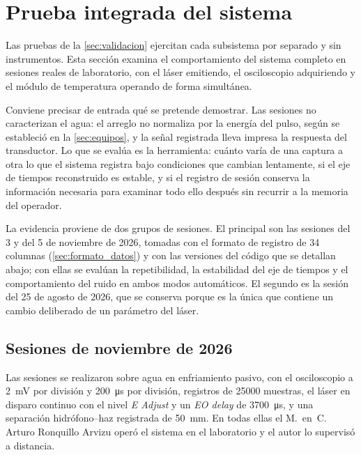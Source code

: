 \section{Prueba integrada del sistema}
\label{sec:prueba_integrada}

Las pruebas de la \cref{sec:validacion} ejercitan cada subsistema por
separado y sin instrumentos. Esta sección examina el comportamiento del
sistema completo en sesiones reales de laboratorio, con el láser
emitiendo, el osciloscopio adquiriendo y el módulo de temperatura
operando de forma simultánea.

Conviene precisar de entrada qué se pretende demostrar. Las sesiones no
caracterizan el agua: el arreglo no normaliza por la energía del pulso,
según se estableció en la \cref{sec:equipos}, y la señal registrada
lleva impresa la respuesta del transductor. Lo que se evalúa es la
herramienta: cuánto varía de una captura a otra lo que el sistema
registra bajo condiciones que cambian lentamente, si el eje de tiempos
reconstruido es estable, y si el registro de sesión conserva la
información necesaria para examinar todo ello después sin recurrir a la
memoria del operador.

La evidencia proviene de dos grupos de sesiones. El principal son las
sesiones del 3 y del 5 de noviembre de 2026, tomadas con el formato de
registro de 34 columnas (\cref{sec:formato_datos}) y con las versiones
del código que se detallan abajo; con ellas se evalúan la
repetibilidad, la estabilidad del eje de tiempos y el comportamiento
del ruido en ambos modos automáticos. El segundo es la sesión del 25 de
agosto de 2026, que se conserva porque es la única que contiene un
cambio deliberado de un parámetro del láser.

\subsection{Sesiones de noviembre de 2026}
\label{sec:sesiones_congeladas}

Las sesiones se realizaron sobre agua en enfriamiento pasivo, con el
osciloscopio a \SI{2}{\milli\volt} por división y
\SI{200}{\micro\second} por división, registros de \num{25000}
muestras, el láser en disparo continuo con el nivel \textit{E Adjust} y
un \textit{EO delay} de \SI{3700}{\micro\second}, y una separación
hidrófono--haz registrada de \SI{50}{\milli\meter}. En todas ellas el
M.~en~C. Arturo Ronquillo Arvizu operó el sistema en el laboratorio y
el autor lo supervisó a distancia.

